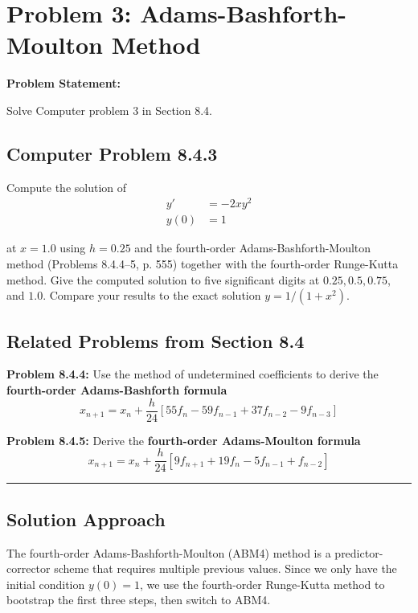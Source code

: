 \clearpage
\section*{Problem 3: Adams-Bashforth-Moulton Method}

\textbf{Problem Statement:} 

Solve Computer problem 3 in Section 8.4.

\subsection*{Computer Problem 8.4.3}

Compute the solution of
\begin{align*}
y' &= -2xy^2 \\
y(0) &= 1
\end{align*}

at $x = 1.0$ using $h = 0.25$ and the fourth-order Adams-Bashforth-Moulton method (Problems 8.4.4--5, p. 555) together with the fourth-order Runge-Kutta method. Give the computed solution to five significant digits at $0.25, 0.5, 0.75$, and $1.0$. Compare your results to the exact solution $y = 1/(1 + x^2)$.

\subsection*{Related Problems from Section 8.4}

\textbf{Problem 8.4.4:} Use the method of undetermined coefficients to derive the \textbf{fourth-order Adams-Bashforth formula}
$$x_{n+1} = x_n + \frac{h}{24}[55f_n - 59f_{n-1} + 37f_{n-2} - 9f_{n-3}]$$

\textbf{Problem 8.4.5:} Derive the \textbf{fourth-order Adams-Moulton formula}
$$x_{n+1} = x_n + \frac{h}{24}[9f_{n+1} + 19f_n - 5f_{n-1} + f_{n-2}]$$

\noindent\rule{\textwidth}{0.4pt}

\vspace{1em}

\subsection*{Solution Approach}

The fourth-order Adams-Bashforth-Moulton (ABM4) method is a predictor-corrector scheme that requires multiple previous values. Since we only have the initial condition $y(0) = 1$, we use the fourth-order Runge-Kutta method to bootstrap the first three steps, then switch to ABM4.

